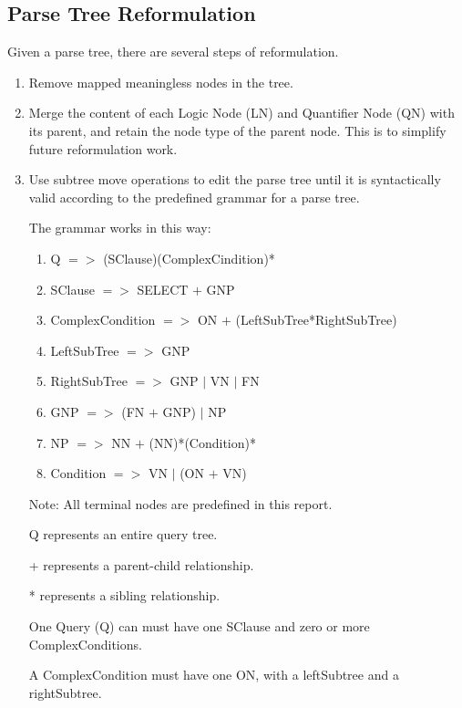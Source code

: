 \documentclass[twocolumn]{article}
\begin{document}
\subsection{Parse Tree Reformulation}
Given a parse tree, there are several steps of reformulation.
\begin{enumerate}
	\item Remove mapped meaningless nodes in the tree.
	
	\item Merge the content of each Logic Node (LN) and Quantifier Node (QN) with its parent, and retain the node type of the parent node. This is to simplify future reformulation work.
	
	\item Use subtree move operations to edit the parse tree until it is syntactically valid according to the predefined grammar for a parse tree.
	
	The grammar works in this way:
	{\small 
	\begin{enumerate}
		\item Q $=>$ (SClause)(ComplexCindition)*
		
		\item SClause $=>$ SELECT $+$ GNP
		
		\item ComplexCondition $=>$ ON $+$ (LeftSubTree*RightSubTree)
		
		\item LeftSubTree $=>$ GNP
		
		\item RightSubTree $=>$ GNP $|$ VN $|$ FN
		
		\item GNP $=>$ (FN $+$ GNP) $|$ NP
		
		\item NP $=>$ NN $+$ (NN)*(Condition)*
		
		\item Condition $=>$ VN $|$ (ON $+$ VN)
	\end{enumerate}
	
	Note:
	All terminal nodes are predefined in this report.
	
	Q represents an entire query tree.
	
	+ represents a parent-child relationship.
	
	* represents a sibling relationship.
	
	One Query (Q) can must have one SClause and zero or more ComplexConditions.
	
	A ComplexCondition must have one ON, with a leftSubtree and a rightSubtree.
	
}
\end{enumerate}
\end{document}
